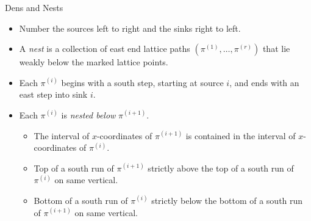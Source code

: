 \documentclass{beamer}
\newcounter{c}
\begin{document}
\begin{frame}{Dens and Nests}
  \begin{itemize}
  \item Number the sources left to right and the sinks right to left.\pause
  \item A \emph{nest} is a collection of east end 
      lattice paths \((\pi^{(1)},\ldots,\pi^{(r)})\) that lie weakly below
      the marked lattice points.\pause
  \item Each \(\pi^{(i)}\) begins with a south step, starting at
    source \(i\), and ends with an
    east step into sink \(i\).\pause
  \item Each \(\pi^{(i)}\) is \emph{nested below} \(\pi^{(i+1)}\).\pause
    \begin{itemize}
    \item The interval of \(x\)-coordinates of \(\pi^{(i+1)}\) is
      contained in the interval of \(x\)-coordinates of \(\pi^{(i)}\).\pause
    \item Top of a south run of \(\pi^{(i+1)}\) strictly above the top of a
      south run of \(\pi^{(i)}\) on same vertical.\pause
    \item Bottom of a south run of \(\pi^{(i)}\) strictly below the bottom of a
      south run of \(\pi^{(i+1)}\) on same vertical.\pause
    \end{itemize}
  \end{itemize}
\end{frame}
\end{document}
